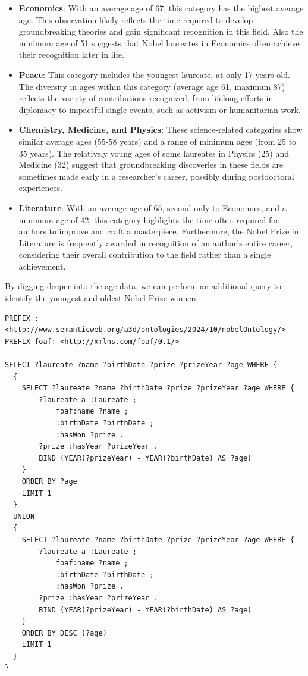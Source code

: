 \documentclass{article}
\begin{document}
\begin{itemize}
	\item \textbf{Economics}: With an average age of 67, this category has the highest average age.
	      This observation likely reflects the time required to develop groundbreaking theories and gain significant
	      recognition in this field. Also the minimum age of 51 suggests that Nobel laureates in Economics often
	      achieve their recognition later in life.

	\item \textbf{Peace}: This category includes the youngest laureate, at only 17 years old.
	      The diversity in ages within this category (average age 61, maximum 87) reflects the variety of
	      contributions recognized, from lifelong efforts in diplomacy to impactful single events, such as activism
	      or humanitarian work.

	\item \textbf{Chemistry, Medicine, and Physics}: These science-related categories show similar average ages
	      (55-58 years) and a range of minimum ages (from 25 to 35 years). The relatively young ages of some laureates
	      in Physics (25) and Medicine (32) suggest that groundbreaking discoveries in these fields are sometimes made
	      early in a researcher's career, possibly during postdoctoral experiences.

	\item \textbf{Literature}: With an average age of 65, second only to Economics, and a minimum age of 42, this
	      category highlights the time often required for authors to improve and craft a masterpiece.
	      Furthermore, the Nobel Prize in Literature is frequently awarded in recognition of an author's
	      entire career, considering their overall contribution to the field rather than a single achievement.
\end{itemize}

By digging deeper into the age data, we can perform an additional query to identify the youngest and oldest
Nobel Prize winners.

\begin{lstlisting}
PREFIX : <http://www.semanticweb.org/a3d/ontologies/2024/10/nobelOntology/>
PREFIX foaf: <http://xmlns.com/foaf/0.1/>

SELECT ?laureate ?name ?birthDate ?prize ?prizeYear ?age WHERE {
  {
    SELECT ?laureate ?name ?birthDate ?prize ?prizeYear ?age WHERE {
        ?laureate a :Laureate ;
            foaf:name ?name ;
            :birthDate ?birthDate ;
            :hasWon ?prize .
        ?prize :hasYear ?prizeYear .
        BIND (YEAR(?prizeYear) - YEAR(?birthDate) AS ?age)
    }
    ORDER BY ?age
    LIMIT 1
  }
  UNION
  {
    SELECT ?laureate ?name ?birthDate ?prize ?prizeYear ?age WHERE {
        ?laureate a :Laureate ;
            foaf:name ?name ;
            :birthDate ?birthDate ;
            :hasWon ?prize .
        ?prize :hasYear ?prizeYear .
        BIND (YEAR(?prizeYear) - YEAR(?birthDate) AS ?age)
    }
    ORDER BY DESC (?age)
    LIMIT 1
  }
}
\end{lstlisting}
\end{document}
